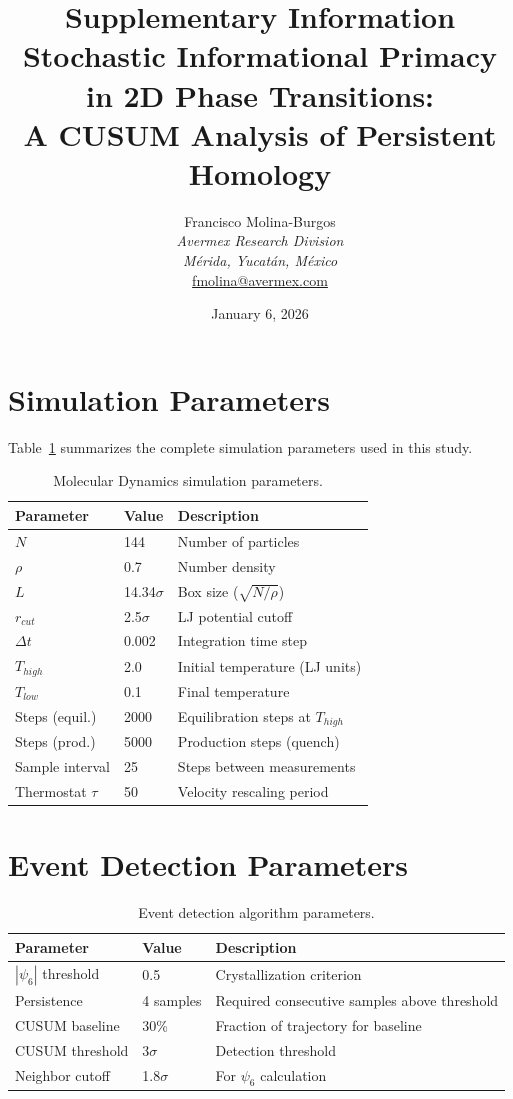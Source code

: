 \documentclass[11pt]{article}
\title{Supplementary Information\\
\large Stochastic Informational Primacy in 2D Phase Transitions:\\
A CUSUM Analysis of Persistent Homology}
\author{Francisco Molina-Burgos\\
\textit{Avermex Research Division}\\
\textit{M\'erida, Yucat\'an, M\'exico}\\
\href{mailto:fmolina@avermex.com}{fmolina@avermex.com}}
\date{January 6, 2026}
\begin{document}
\maketitle

\section{Simulation Parameters}

Table~\ref{tab:params} summarizes the complete simulation parameters used in this study.

\begin{table}[h]
\centering
\caption{Molecular Dynamics simulation parameters.}
\label{tab:params}
\begin{tabular}{lll}
\toprule
\textbf{Parameter} & \textbf{Value} & \textbf{Description} \\
\midrule
$N$ & 144 & Number of particles \\
$\rho$ & 0.7 & Number density \\
$L$ & 14.34$\sigma$ & Box size ($\sqrt{N/\rho}$) \\
$r_{cut}$ & 2.5$\sigma$ & LJ potential cutoff \\
$\Delta t$ & 0.002 & Integration time step \\
$T_{high}$ & 2.0 & Initial temperature (LJ units) \\
$T_{low}$ & 0.1 & Final temperature \\
Steps (equil.) & 2000 & Equilibration steps at $T_{high}$ \\
Steps (prod.) & 5000 & Production steps (quench) \\
Sample interval & 25 & Steps between measurements \\
Thermostat $\tau$ & 50 & Velocity rescaling period \\
\bottomrule
\end{tabular}
\end{table}

\section{Event Detection Parameters}

\begin{table}[h]
\centering
\caption{Event detection algorithm parameters.}
\label{tab:detection}
\begin{tabular}{lll}
\toprule
\textbf{Parameter} & \textbf{Value} & \textbf{Description} \\
\midrule
$|\psi_6|$ threshold & 0.5 & Crystallization criterion \\
Persistence & 4 samples & Required consecutive samples above threshold \\
CUSUM baseline & 30\% & Fraction of trajectory for baseline \\
CUSUM threshold & 3$\sigma$ & Detection threshold \\
Neighbor cutoff & 1.8$\sigma$ & For $\psi_6$ calculation \\
\bottomrule
\end{tabular}
\end{table}
\end{document}
